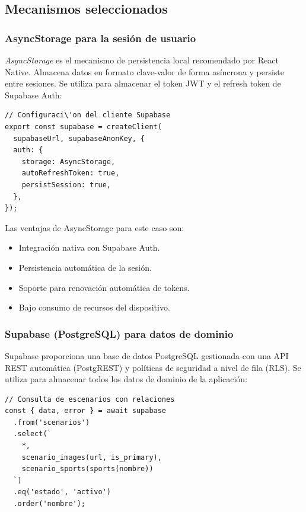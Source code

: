 \subsection{Mecanismos seleccionados}

\subsubsection{AsyncStorage para la sesi\'on de usuario}

\textit{AsyncStorage} es el mecanismo de persistencia local recomendado
por React Native. Almacena datos en formato clave-valor de forma
as\'incrona y persiste entre sesiones. Se utiliza para almacenar el
token JWT y el refresh token de Supabase Auth:

\begin{lstlisting}
// Configuraci\'on del cliente Supabase
export const supabase = createClient(
  supabaseUrl, supabaseAnonKey, {
  auth: {
    storage: AsyncStorage,
    autoRefreshToken: true,
    persistSession: true,
  },
});
\end{lstlisting}

Las ventajas de AsyncStorage para este caso son:

\begin{itemize}
  \item Integraci\'on nativa con Supabase Auth.
  \item Persistencia autom\'atica de la sesi\'on.
  \item Soporte para renovaci\'on autom\'atica de tokens.
  \item Bajo consumo de recursos del dispositivo.
\end{itemize}

\subsubsection{Supabase (PostgreSQL) para datos de dominio}

Supabase proporciona una base de datos PostgreSQL gestionada con
una API REST autom\'atica (PostgREST) y pol\'iticas de seguridad
a nivel de fila (RLS). Se utiliza para almacenar todos los datos
de dominio de la aplicaci\'on:

\begin{lstlisting}
// Consulta de escenarios con relaciones
const { data, error } = await supabase
  .from('scenarios')
  .select(`
    *,
    scenario_images(url, is_primary),
    scenario_sports(sports(nombre))
  `)
  .eq('estado', 'activo')
  .order('nombre');
\end{lstlisting}

